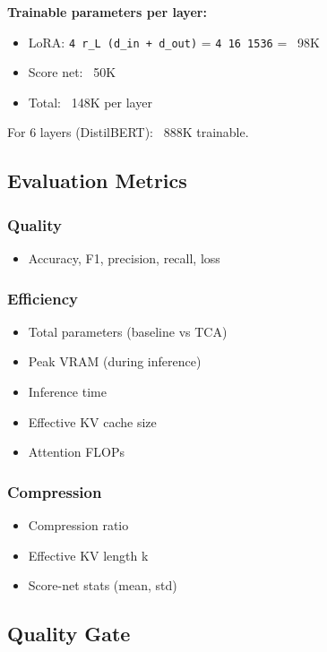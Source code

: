 \textbf{Trainable parameters per layer:}
\begin{itemize}
\item LoRA: \texttt{4   r\_L (d\_in + d\_out)} = \texttt{4   16   1536} = ~98K
\item Score net: ~50K
\item Total: ~148K per layer

\end{itemize}
For 6 layers (DistilBERT): ~888K trainable.

\subsection{Evaluation Metrics}

\subsubsection{Quality}
\begin{itemize}
\item Accuracy, F1, precision, recall, loss

\end{itemize}
\subsubsection{Efficiency}
\begin{itemize}
\item Total parameters (baseline vs TCA)
\item Peak VRAM (during inference)
\item Inference time
\item Effective KV cache size
\item Attention FLOPs

\end{itemize}
\subsubsection{Compression}
\begin{itemize}
\item Compression ratio
\item Effective KV length k
\item Score-net stats (mean, std)

\end{itemize}
\subsection{Quality Gate}

